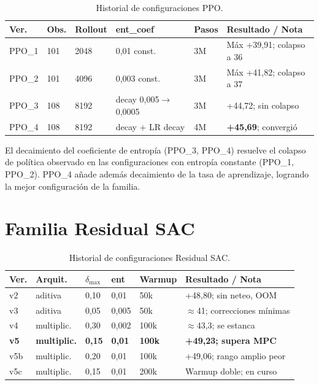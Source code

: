 \documentclass[12pt, a4paper, twoside]{report}
\begin{document}
\begin{table}[H]
\centering
\caption{Historial de configuraciones PPO.}
\label{tab:hist_ppo}
\small
\begin{tabularx}{\textwidth}{lL{1.2cm}L{1.6cm}L{2.2cm}L{1cm}X}
\toprule
\textbf{Ver.} & \textbf{Obs.} & \textbf{Rollout} & \textbf{ent\_coef} &
\textbf{Pasos} & \textbf{Resultado / Nota} \\
\midrule
PPO\_1 & 101 & 2048 & 0{,}01 const. & 3M & Máx +39{,}91; colapso a 36 \\
PPO\_2 & 101 & 4096 & 0{,}003 const. & 3M & Máx +41{,}82; colapso a 37 \\
PPO\_3 & 108 & 8192 & decay 0{,}005$\to$0{,}0005 & 3M & +44{,}72; sin colapso \\
PPO\_4 & 108 & 8192 & decay + LR decay & 4M & \textbf{+45{,}69}; convergió \\
\bottomrule
\end{tabularx}
\end{table}

El decaimiento del coeficiente de entropía (PPO\_3, PPO\_4) resuelve el colapso
de política observado en las configuraciones con entropía constante (PPO\_1,
PPO\_2). PPO\_4 añade además decaimiento de la tasa de aprendizaje, logrando la
mejor configuración de la familia.

\section{Familia Residual SAC}

\begin{table}[H]
\centering
\caption{Historial de configuraciones Residual SAC.}
\label{tab:hist_sac}
\small
\begin{tabularx}{\textwidth}{lL{2cm}L{1.3cm}L{1.2cm}L{1.3cm}X}
\toprule
\textbf{Ver.} & \textbf{Arquit.} & \textbf{$\delta_{\max}$} &
\textbf{ent} & \textbf{Warmup} & \textbf{Resultado / Nota} \\
\midrule
v2 & aditiva & 0{,}10 & 0{,}01 & 50k & +48{,}80; sin neteo, OOM \\
v3 & aditiva & 0{,}05 & 0{,}005 & 50k & $\approx$41; correcciones mínimas \\
v4 & multiplic. & 0{,}30 & 0{,}002 & 100k & $\approx$43{,}3; se estanca \\
\textbf{v5} & \textbf{multiplic.} & \textbf{0{,}15} & \textbf{0{,}01} &
\textbf{100k} & \textbf{+49{,}23; supera MPC} \\
v5b & multiplic. & 0{,}20 & 0{,}01 & 100k & +49{,}06; rango amplio peor \\
v5c & multiplic. & 0{,}15 & 0{,}01 & 200k & Warmup doble; en curso \\
\bottomrule
\end{tabularx}
\end{table}
\end{document}

